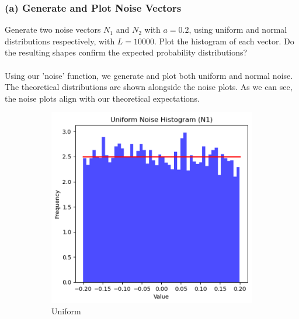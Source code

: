 \documentclass[hidelinks,12pt]{article}
\begin{document}
	\subsubsection*{(a) Generate and Plot Noise Vectors}
	Generate two noise vectors $N_1$ and $N_2$ with $a = 0.2$, using uniform and normal distributions respectively, with $L = 10000$. Plot the histogram of each vector. Do the resulting shapes confirm the expected probability distributions?
	\\ \\
	Using our 'noise' function, we generate and plot both uniform and normal noise. The theoretical distributions are shown alongside the noise plots. As we can see, the noise plots align with our theoretical expectations.
	\begin{figure}[h!]
		\centering
		\begin{subfigure}[b]{0.45\textwidth}
			\centering
			\includegraphics[width=\textwidth]{figures/uniform_noise_dist.PNG}
			\caption{Uniform}
		\end{subfigure}
		\hspace{0.5cm}
		\begin{subfigure}[b]{0.45\textwidth}
			\centering

\end{subfigure}
\end{figure}
\end{document}
